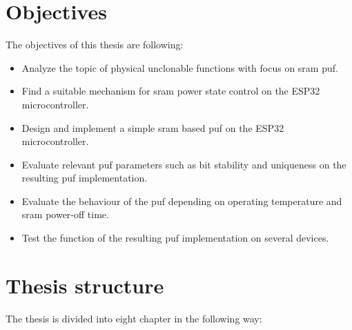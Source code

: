 \section*{Objectives}
{}

The objectives of this thesis are following:

\begin{itemize}
    \item Analyze the topic of physical unclonable functions with focus on \gls{sram} \gls{puf}.
    \item Find a suitable mechanism for \gls{sram} power state control on the ESP32 microcontroller.
    \item Design and implement a simple \gls{sram} based \gls{puf} on the ESP32 microcontroller.
    \item Evaluate relevant \gls{puf} parameters such as bit stability and uniqueness on the resulting \gls{puf} implementation.
    \item Evaluate the behaviour of the \gls{puf} depending on operating temperature and \gls{sram} power-off time.
    \item Test the function of the resulting \gls{puf} implementation on several devices.
\end{itemize}

\section*{Thesis structure}
{}

The thesis is divided into eight chapter in the following way:

\newcommand\litem[1]{\item{\bfseries #1,\\}}

